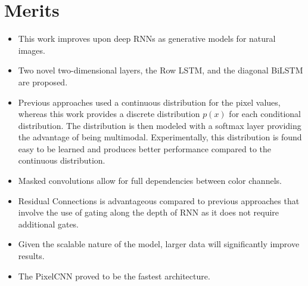 \documentclass{article}
\begin{document}
\section{Merits}
\begin{itemize}
	\item This work improves upon deep RNNs as generative models for natural images.
	\item Two novel two-dimensional layers, the Row LSTM, and the diagonal BiLSTM are proposed.
	\item Previous approaches used a continuous distribution for the pixel values, whereas this work provides a discrete distribution $ p(x) $ for each conditional distribution. The distribution is then modeled with a softmax layer providing the advantage of being multimodal. Experimentally, this distribution is found easy to be learned and produces better performance compared to the continuous distribution.
	\item Masked convolutions allow for full dependencies between color channels.
	\item Residual Connections is advantageous compared to previous approaches that involve the use of gating along the depth of RNN as it does not require additional gates.
	\item Given the scalable nature of the model, larger data will significantly improve results.
	\item The PixelCNN proved to be the fastest architecture.
\end{itemize}
\end{document}
